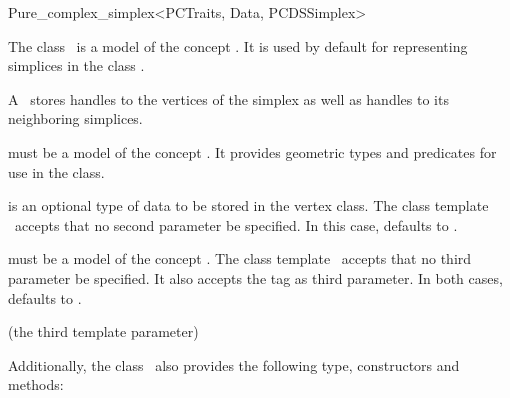 \begin{ccRefClass}{Pure_complex_simplex<PCTraits, Data, PCDSSimplex>}

\ccDefinition

The class \ccRefName\ is a model of the concept . It
is used by default for representing simplices in the class
.

A \ccRefName\ stores handles to the vertices of the simplex as well as handles
to its neighboring simplices.


\ccParameters

 must be a model of the concept . It
provides geometric types and predicates for use in the
 class.

 is an optional type of data to be stored in the vertex class. The
class template \ccRefName\ accepts that no second parameter be specified. In
this case,  defaults to .

 must be a model of the concept .
The class template \ccRefName\ accepts that no third parameter be specified.
It also accepts the tag  as third parameter. In both
cases,  defaults to .

\ccInheritsFrom

 (the third template parameter)

\ccIsModel


Additionally, the class \ccRefName\ also provides the following type,
constructors and methods:

\ccTypes


\ccCreation
{}




\end{ccRefClass}
